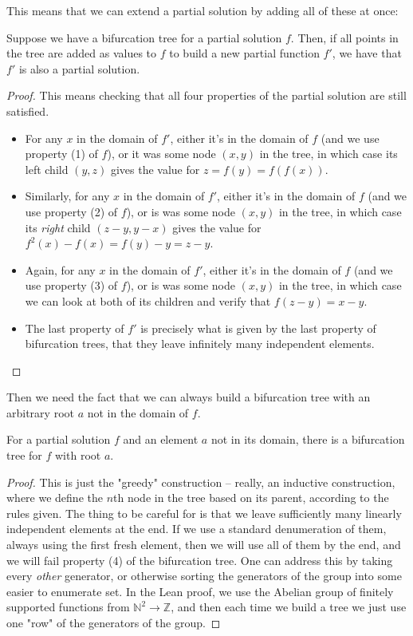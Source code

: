 This means that we can extend a partial solution by adding all of these at once:
\begin{corollary}\label{extend-with-tree}
Suppose we have a bifurcation tree for a partial solution $f$. Then, if all points in the tree are added as values to $f$ to build a new partial function $f'$, we have that $f'$ is also a partial solution.
\end{corollary}
\begin{proof}
This means checking that all four properties of the partial solution are still satisfied.
\begin{itemize}
  \item For any $x$ in the domain of $f'$, either it's in the domain of $f$ (and we use property (1) of $f$), or it was some node $(x,y)$ in the tree, in which case its left child $(y,z)$ gives the value for $z = f(y) = f(f(x))$.
  \item Similarly, for any $x$ in the domain of $f'$, either it's in the domain of $f$ (and we use property (2) of $f$), or is was some node $(x,y)$ in the tree, in which case its {\em right} child $(z-y,y-x)$ gives the value for $f^2(x) - f(x) = f(y) - y = z - y$.
  \item Again, for any $x$ in the domain of $f'$, either it's in the domain of $f$ (and we use property (3) of $f$), or is was some node $(x,y)$ in the tree, in which case we can look at both of its children and verify that $f(z-y) = x-y$.
  \item The last property of $f'$ is precisely what is given by the last property of bifurcation trees, that they leave infinitely many independent elements.
\end{itemize}
\end{proof}

Then we need the fact that we can always build a bifurcation tree with an arbitrary root $a$ not in the domain of $f$.
\begin{lemma}
  For a partial solution $f$ and an element $a$ not in its domain, there is a bifurcation tree for $f$ with root $a$.
\end{lemma}
\begin{proof}
This is just the "greedy" construction -- really, an inductive construction, where we define the $n$th node in the tree based on its parent, according to the rules given. The thing to be careful for is that we leave sufficiently many linearly independent elements at the end. If we use a standard denumeration of them, always using the first fresh element, then we will use all of them by the end, and we will fail property (4) of the bifurcation tree. One can address this by taking every {\em other} generator, or otherwise sorting the generators of the group into some easier to enumerate set. In the Lean proof, we use the Abelian group of finitely supported functions from $\mathbb{N}^2 \to \mathbb{Z}$, and then each time we build a tree we just use one "row" of the generators of the group.
\end{proof}

